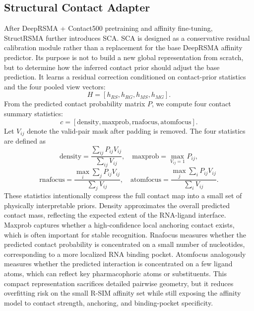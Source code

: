 \documentclass[journal=jcisd8,manuscript=article]{achemso}
\begin{document}
\subsection{Structural Contact Adapter}

After DeepRSMA + Contact500 pretraining and affinity fine-tuning, StructRSMA further introduces SCA. SCA is designed as a conservative residual calibration module rather than a replacement for the base DeepRSMA affinity predictor. Its purpose is not to build a new global representation from scratch, but to determine how the inferred contact prior should adjust the base prediction. It learns a residual correction conditioned on contact-prior statistics and the four pooled view vectors:
\begin{equation}
H=[h_{RS},h_{RG},h_{MS},h_{MG}].
\end{equation}
From the predicted contact probability matrix $P$, we compute four contact summary statistics:
\begin{equation}
c=[\mathrm{density},\mathrm{maxprob},\mathrm{rnafocus},\mathrm{atomfocus}].
\end{equation}
Let $V_{ij}$ denote the valid-pair mask after padding is removed. The four statistics are defined as
\begin{equation}
\mathrm{density}=\frac{\sum_{ij}P_{ij}V_{ij}}{\sum_{ij}V_{ij}}, \quad
\mathrm{maxprob}=\max_{V_{ij}=1}P_{ij},
\end{equation}
\begin{equation}
\mathrm{rnafocus}=\frac{\max_i\sum_jP_{ij}V_{ij}}{\sum_j V_{ij}}, \quad
\mathrm{atomfocus}=\frac{\max_j\sum_iP_{ij}V_{ij}}{\sum_i V_{ij}}.
\end{equation}
These statistics intentionally compress the full contact map into a small set of physically interpretable priors. Density approximates the overall predicted contact mass, reflecting the expected extent of the RNA-ligand interface. Maxprob captures whether a high-confidence local anchoring contact exists, which is often important for stable recognition. Rnafocus measures whether the predicted contact probability is concentrated on a small number of nucleotides, corresponding to a more localized RNA binding pocket. Atomfocus analogously measures whether the predicted interaction is concentrated on a few ligand atoms, which can reflect key pharmacophoric atoms or substituents. This compact representation sacrifices detailed pairwise geometry, but it reduces overfitting risk on the small R-SIM affinity set while still exposing the affinity model to contact strength, anchoring, and binding-pocket specificity.
\end{document}
